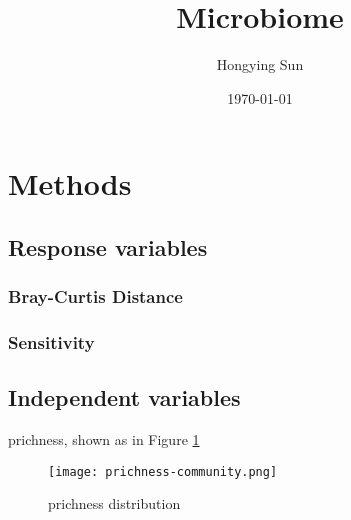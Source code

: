 \documentclass{article}
\title{Microbiome}
\author{Hongying Sun
	}
\date{\today}
\begin{document}
\maketitle

\section{Methods}
\subsection{Response variables}
\subsubsection{Bray-Curtis Distance}
\subsubsection{Sensitivity}
\subsection{Independent variables}
prichness, shown as in Figure \ref{prichness-community}
\begin{figure}[htbp]
	\centering
	\texttt{[image: prichness-community.png]}\\
	\caption{prichness distribution}
	\label{prichness-community}
\end{figure}
\end{document}
